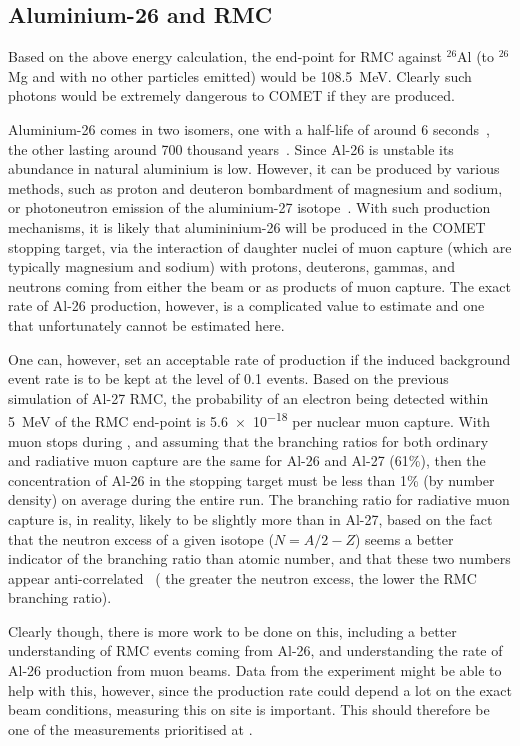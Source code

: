 \subsection{Aluminium-26 and \acs{RMC}}
Based on the above energy calculation, the end-point for \ac{RMC} against ${}^{26}$Al (to ${}^{26}$Mg and with no other particles emitted) would be 108.5~MeV.
Clearly such photons would be extremely dangerous to COMET if they are produced.

Aluminium-26 comes in two isomers, one with a half-life of around 6 seconds~\cite{PhysRevLett.106.032501}, the other lasting around 700 thousand years~\cite{AUDI20033}.
Since Al-26 is unstable its abundance in natural aluminium is low.
However, it can be produced by various methods, such as proton and deuteron bombardment of magnesium and sodium, or photoneutron emission of the aluminium-27 isotope~\cite{THOMPSON1965486}.
With such production mechanisms, it is likely that alumininium-26 will be produced in the COMET stopping target, via the interaction of daughter nuclei of muon capture (which are typically magnesium and sodium)
with protons, deuterons, gammas, and neutrons coming from either the beam or as products of muon capture.
The exact rate of Al-26 production, however, is a complicated value to estimate and one that unfortunately cannot be estimated here.

One can, however, set an acceptable rate of production if the induced background event rate is to be kept at the level of 0.1 events.
Based on the previous simulation of Al-27 \ac{RMC}, the probability of an electron being detected within 5~MeV of the \ac{RMC} end-point is \num{5.6e-18} per nuclear muon capture.
With \VarTotalMuStops muon stops during \phaseII, and assuming that the branching ratios for both ordinary and radiative muon capture are the same for Al-26 and Al-27 (61\%), then the
concentration of Al-26 in the stopping target must be less than 1\% (by number density) on average during the entire \phaseII run.
The branching ratio for radiative muon capture is, in reality, likely to be slightly more than in Al-27, based on the fact that the neutron excess of a given isotope ($N=A/2-Z$) seems a better indicator of the branching ratio than atomic number, and that these two numbers appear anti-correlated~\cite{RevModPhys.76.31} ( the greater the neutron excess, the lower the RMC branching ratio).

Clearly though, there is more work to be done on this, including a better understanding of \ac{RMC} events coming from Al-26, and understanding the rate of Al-26 production from muon beams.
Data from the \alcap experiment might be able to help with this, however, since the production rate could depend a lot on the exact beam conditions, measuring this on site is important.
This should therefore be one of the measurements prioritised at \phaseI.

